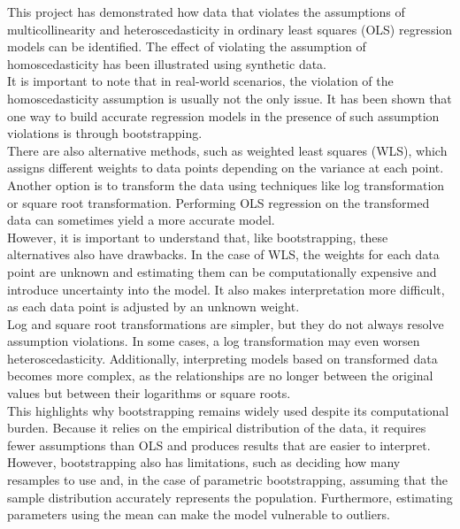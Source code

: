 This project has demonstrated how data that violates the assumptions of multicollinearity and heteroscedasticity in ordinary least squares (OLS) regression models can be identified. The effect of violating the assumption of homoscedasticity has been illustrated using synthetic data.
\\
It is important to note that in real-world scenarios, the violation of the homoscedasticity assumption is usually not the only issue. It has been shown that one way to build accurate regression models in the presence of such assumption violations is through bootstrapping.
\\
There are also alternative methods, such as weighted least squares (WLS), which assigns different weights to data points depending on the variance at each point. Another option is to transform the data using techniques like log transformation or square root transformation. Performing OLS regression on the transformed data can sometimes yield a more accurate model.
\\
However, it is important to understand that, like bootstrapping, these alternatives also have drawbacks. In the case of WLS, the weights for each data point are unknown and estimating them can be computationally expensive and introduce uncertainty into the model. It also makes interpretation more difficult, as each data point is adjusted by an unknown weight.
\\
Log and square root transformations are simpler, but they do not always resolve assumption violations. In some cases, a log transformation may even worsen heteroscedasticity. Additionally, interpreting models based on transformed data becomes more complex, as the relationships are no longer between the original values but between their logarithms or square roots.
\\
This highlights why bootstrapping remains widely used despite its computational burden. Because it relies on the empirical distribution of the data, it requires fewer assumptions than OLS and produces results that are easier to interpret. However, bootstrapping also has limitations, such as deciding how many resamples to use and, in the case of parametric bootstrapping, assuming that the sample distribution accurately represents the population. Furthermore, estimating parameters using the mean can make the model vulnerable to outliers.
